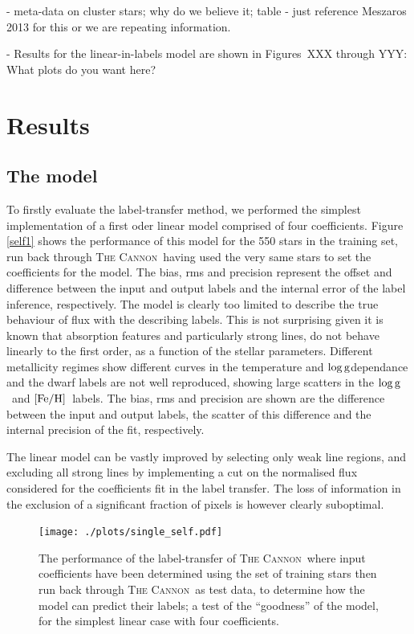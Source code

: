 \documentclass[12pt, preprint]{aastex}
\newcommand{\feh}{\mbox{$\rm [Fe/H]$}}
\newcommand{\logg}{\mbox{$\rm \log g$}}
\newcommand{\tc}{\textsc{The Cannon}}
\begin{document}
- meta-data on cluster stars; why do we believe it; table - just reference Meszaros 2013 for this or we are repeating information. 

- Results for the linear-in-labels model are shown in Figures~XXX through YYY: What plots do you want here? 


\section{Results}

\subsection{The model} 

To firstly evaluate the label-transfer method, we performed the simplest implementation of a first oder linear model comprised of four coefficients. Figure \ref{self1} shows the performance of this model for the 550 stars in the training set, run back through \tc\, having used the very same stars to set the coefficients for the model. The bias, rms and precision represent the offset and difference between the input and output labels and the internal error of the label inference, respectively. The model is clearly too limited to describe the true behaviour of flux with the describing labels. This is not surprising given it is known that absorption features and particularly strong lines, do not behave linearly to the first order, as a function of the stellar parameters. Different metallicity regimes show different curves in the temperature and \logg dependance and the dwarf labels are not well reproduced, showing large scatters in the \logg\ and \feh\ labels. The bias, rms and precision are shown are the difference between the input and output labels, the scatter of this difference and the internal precision of the fit, respectively. 

The linear model can be vastly improved by selecting only weak line regions, and excluding all strong lines by implementing a cut on the normalised flux considered for the coefficients fit in the label transfer. The loss of information in the exclusion of a significant fraction of pixels is however clearly suboptimal. 

\begin{figure}[h!]
\centering
  \texttt{[image: ./plots/single\_self.pdf]}
\caption{The performance of the label-transfer of \tc\, where input coefficients have been determined using the set of training stars then run back through \tc\ as test data, to determine how the model can predict their labels; a test of the ``goodness'' of the model, for the simplest linear case with four coefficients. }
\label{fig:self1}
\end{figure}
\end{document}
